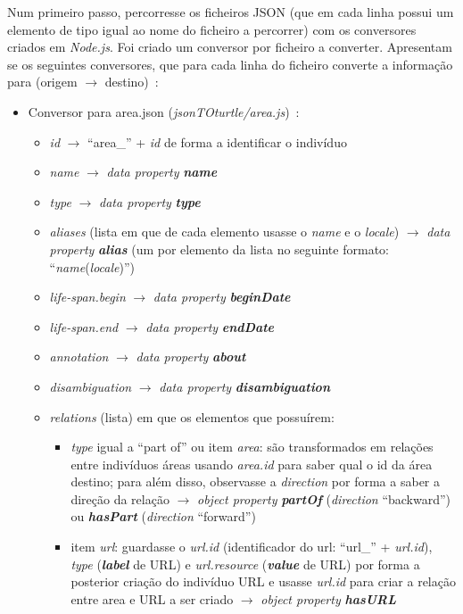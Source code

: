 \documentclass{article}
\begin{document}
Num primeiro passo, percorresse os ficheiros JSON (que em cada linha possui um elemento de tipo igual ao nome do ficheiro a percorrer) com os conversores criados em \textit{Node.js}. Foi criado um conversor por ficheiro a converter. Apresentam se os seguintes conversores, que para cada linha do ficheiro converte a informação para (origem $\to$ destino)~\cite{mbSchema,mbRels}:
\begin{itemize}
    \item Conversor para area.json (\textit{jsonTOturtle/area.js})~\cite{mbAr}:
        \begin{itemize}
            \item \textit{id} $\to$ ``area\_'' + \textit{id} de forma a identificar o indivíduo
            \item \textit{name} $\to$ \textit{data property} \textit{\textbf{name}}
            \item \textit{type} $\to$ \textit{data property} \textit{\textbf{type}}
            \item \textit{aliases} (lista em que de cada elemento usasse o \textit{name} e o \textit{locale}) $\to$ \textit{data property} \textit{\textbf{alias}} (um por elemento da lista no seguinte formato: ``\textit{name}(\textit{locale})'')
            \item \textit{life-span.begin} $\to$ \textit{data property} \textit{\textbf{beginDate}}
            \item \textit{life-span.end} $\to$ \textit{data property} \textit{\textbf{endDate}}
            \item \textit{annotation} $\to$ \textit{data property} \textit{\textbf{about}}
            \item \textit{disambiguation} $\to$ \textit{data property} \textit{\textbf{disambiguation}}
            \item \textit{relations} (lista) em que os elementos que possuírem:
                \begin{itemize}
                    \item \textit{type} igual a ``part of'' ou item \textit{area}: são transformados em relações entre indivíduos áreas usando \textit{area.id} para saber qual o id da área destino; para além disso, observasse a \textit{direction} por forma a saber a direção da relação $\to$ \textit{object property} \textit{\textbf{partOf}} (\textit{direction} ``backward'') ou \textit{\textbf{hasPart}} (\textit{direction} ``forward'')
                    \item item \textit{url}: guardasse o \textit{url.id} (identificador do url: ``url\_'' + \textit{url.id}), \textit{type} (\textit{\textbf{label}} de URL) e \textit{url.resource} (\textit{\textbf{value}} de URL) por forma a posterior criação do indivíduo URL e usasse \textit{url.id} para criar a relação entre area e URL a ser criado $\to$ \textit{object property} \textit{\textbf{hasURL}}

\end{itemize}
\end{itemize}
\end{itemize}
\end{document}
